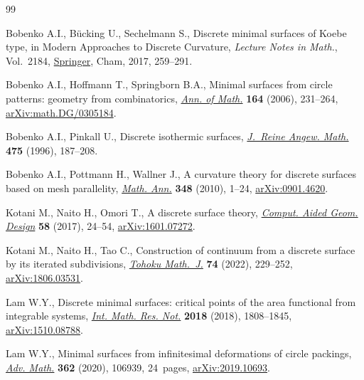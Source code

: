\begin{thebibliography}{99}
\footnotesize\itemsep=0pt

Bobenko A.I., B\"ucking U., Sechelmann S., Discrete minimal surfaces of {K}oebe
  type, in Modern {A}pproaches to {D}iscrete {C}urvature, \textit{Lecture Notes
  in Math.}, Vol.~2184,  \href{https://doi.org/10.1007/978-3-319-58002-9_8}{Springer}, Cham, 2017, 259--291.

Bobenko A.I., Hoffmann T., Springborn B.A., Minimal surfaces from circle
  patterns: geometry from combinatorics, \href{https://doi.org/10.4007/annals.2006.164.231}{\textit{Ann. of Math.}} \textbf{164}
  (2006), 231--264, \href{https://arxiv.org/abs/math.DG/0305184}{arXiv:math.DG/0305184}.

Bobenko A.I., Pinkall U., Discrete isothermic surfaces,  \href{https://doi.org/10.1515/crll.1996.475.187}{\textit{J.~Reine Angew.
  Math.}} \textbf{475} (1996), 187--208.

Bobenko A.I., Pottmann H., Wallner J., A curvature theory for discrete surfaces
  based on mesh parallelity,  \href{https://doi.org/10.1007/s00208-009-0467-9}{\textit{Math. Ann.}} \textbf{348} (2010), 1--24,
  \href{https://arxiv.org/abs/0901.4620}{arXiv:0901.4620}.

Kotani M., Naito H., Omori T., A discrete surface theory, \href{https://doi.org/10.1016/j.cagd.2017.09.002}{\textit{Comput. Aided
  Geom. Design}} \textbf{58} (2017), 24--54, \href{https://arxiv.org/abs/1601.07272}{arXiv:1601.07272}.

Kotani M., Naito H., Tao C., Construction of continuum from a discrete surface
  by its iterated subdivisions, \href{https://doi.org/10.2748/tmj.20201225}{\textit{Tohoku Math.~J.}} \textbf{74} (2022),
  229--252, \href{https://arxiv.org/abs/1806.03531}{arXiv:1806.03531}.

Lam W.Y., Discrete minimal surfaces: critical points of the area functional
  from integrable systems, \href{https://doi.org/10.1093/imrn/rnw267}{\textit{Int. Math. Res. Not.}} \textbf{2018} (2018),
  1808--1845, \href{https://arxiv.org/abs/1510.08788}{arXiv:1510.08788}.

Lam W.Y., Minimal surfaces from infinitesimal deformations of circle packings,
  \href{https://doi.org/10.1016/j.aim.2019.106939}{\textit{Adv. Math.}} \textbf{362} (2020), 106939, 24~pages,
  \href{https://arxiv.org/abs/2019.10693}{arXiv:2019.10693}.


\end{thebibliography}
